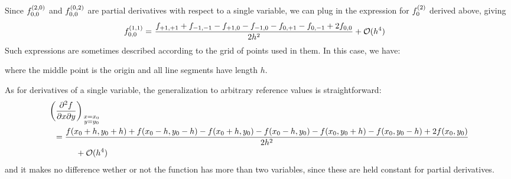 \documentclass[11pt]{article}
\begin{document}
Since $f^{(2,0)}_{0,0}$ and $f^{(0,2)}_{0,0}$ are partial derivatives with
respect to a single variable, we can plug in the expression for $f^{(2)}_0$
derived above, giving
\begin{align*}
    f\ord{1,1}_{0,0} =&\ 
    \fr{f_{+1,+1}+f_{-1,-1}
        -f_{+1,0}-f_{-1,0}
        -f_{0,+1}-f_{0,-1}+2f_{0,0}
    }{2h^2}
    +\bigo(h^4)
\end{align*}
Such expressions are sometimes described according to the grid of points used
in them. In this case, we have:
\begin{center}
\end{center}
where the middle point is the origin and all line segments have length $h$.

As for derivatives of a single variable, the generalization to arbitrary
reference values is straightforward:
{\small
\begin{align*}
    &\pr{\fr{\pt^2f}{\pt x\pt y}}_{\miniar{x=x_0\\y=y_0}}\\ & \ \ =
    \fr{f(x_0+h,y_0+h)+f(x_0-h,y_0-h)-f(x_0+h,y_0)-f(x_0-h,y_0)-f(x_0,y_0+h)-f(x_0,y_0-h)+2f(x_0,y_0)}{2h^2} \\ &\sp + \bigo(h^4)
\end{align*} }
and it makes no difference wether or not the function has more than two
variables, since these are held constant for partial derivatives.
\end{document}
